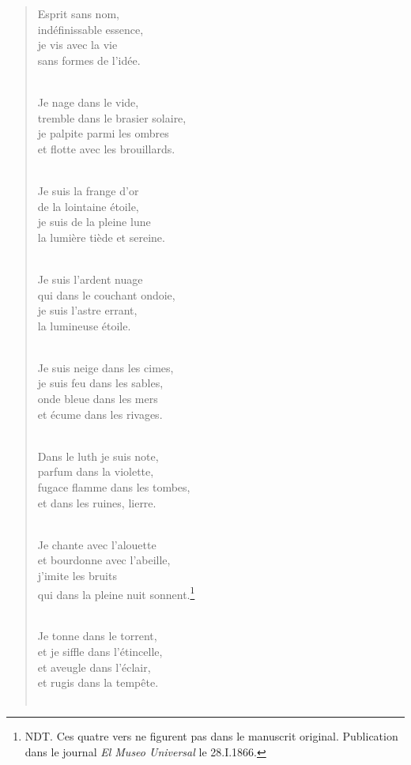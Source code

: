 \documentclass[a4paper,11pt]{book}
\begin{document}
\begin{verse}
Esprit sans nom, \\
indéfinissable essence, \\
je vis avec la vie \\
sans formes de l'idée. \\ \

Je nage dans le vide, \\
tremble dans le brasier solaire, \\
je palpite parmi les ombres \\
et flotte avec les brouillards. \\ \

Je suis la frange d'or \\
de la lointaine étoile, \\
je suis de la pleine lune \\
la lumière tiède et sereine. \\ \

Je suis l'ardent nuage \\
qui dans le couchant ondoie, \\
je suis l'astre errant, \\
la lumineuse étoile. \\ \

Je suis neige dans les cimes, \\
je suis feu dans les sables, \\
onde bleue dans les mers \\
et écume dans les rivages. \\ \

Dans le luth je suis note, \\
parfum dans la violette, \\
fugace flamme dans les tombes, \\
et dans les ruines, lierre. \\ \

Je chante avec l'alouette \\
et bourdonne avec l'abeille, \\
j'imite les bruits \\
qui dans la pleine nuit sonnent.\footnote{NDT. Ces quatre vers ne figurent pas dans le manuscrit original. Publication dans le journal {\em El Museo Universal} le 28.I.1866.} \\ \


Je tonne dans le torrent, \\
et je siffle dans l'étincelle, \\
et aveugle dans l'éclair, \\
et rugis dans la tempête. \\ \


\end{verse}
\end{document}
